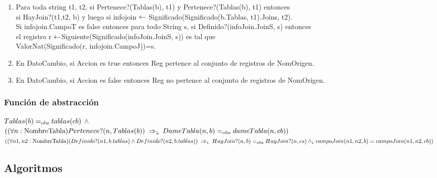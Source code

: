\begin{enumerate}
  \item Para toda string t1, t2, si Pertenece?(Tablas(b), t1) y Pertenece?(Tablas(b), t1) entonces\\
  si HayJoin?(t1,t2, b) y luego si infojoin $\leftarrow$ Significado(Significado(b.Tablas, t1).Joins, t2).\\
  Si infojoin.CampoT es false entonces para todo String s, si Definido?(infoJoin.JoinS, s) entonces\\
  el registro r $\leftarrow$Siguiente(Significado(infoJoin.JoinS, s)) es tal que \\
  ValorNat(Significado(r, infojoin.CampoJ))=s.
  
  
  
  \item En DatoCambio, si Accion es true entonces Reg pertence al conjunto de registros de NomOrigen.
  \item En DatoCambio, si Accion es false entonces Reg no pertence al conjunto de registros de NomOrigen.

\end{enumerate}


\subsubsection*{Función de abstracción}

$ Tablas(b)=_{\mathrm{obs}} tablas(cb)$ $\land$ \\
$((\paratodo{NombreTabla}{n}) Pertenece?(n, Tablas(b)) \impluego DameTabla(n, b) \igobs dameTabla(n,cb))$ \\
$((\paratodo{NombreTabla}{n1, n2}) (Definido?(n1, b.tablas) \land Definido?(n2, b.tablas)) \impluego HayJoin?(n, b) \igobs HayJoin?(n,cs) \yluego campoJoin(n1,n2, b)=campoJoin(n1,n2, cb))$ \\



\newpage

\subsection{Algoritmos}



